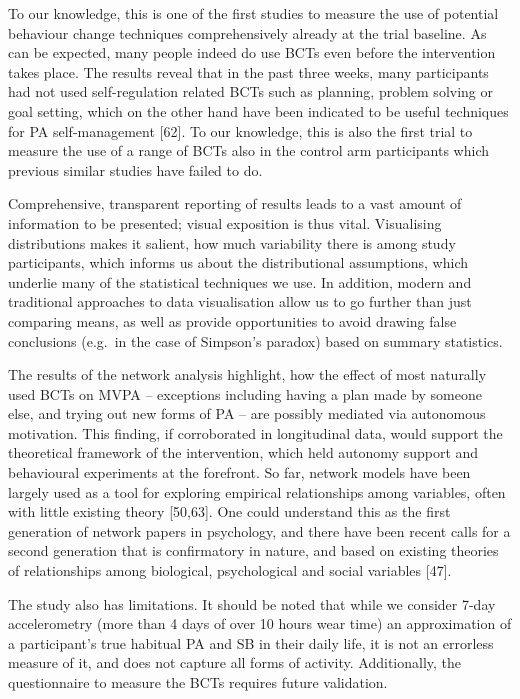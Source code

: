 \documentclass[english,man,floatsintext]{apa6}
\begin{document}
To our knowledge, this is one of the first studies to measure the use of potential behaviour change techniques comprehensively already at the trial baseline. As can be expected, many people indeed do use BCTs even before the intervention takes place. The results reveal that in the past three weeks, many participants had not used self-regulation related BCTs such as planning, problem solving or goal setting, which on the other hand have been indicated to be useful techniques for PA self-management {[}62{]}. To our knowledge, this is also the first trial to measure the use of a range of BCTs also in the control arm participants which previous similar studies have failed to do.

Comprehensive, transparent reporting of results leads to a vast amount of information to be presented; visual exposition is thus vital. Visualising distributions makes it salient, how much variability there is among study participants, which informs us about the distributional assumptions, which underlie many of the statistical techniques we use. In addition, modern and traditional approaches to data visualisation allow us to go further than just comparing means, as well as provide opportunities to avoid drawing false conclusions (e.g.~in the case of Simpson's paradox) based on summary statistics.

The results of the network analysis highlight, how the effect of most naturally used BCTs on MVPA -- exceptions including having a plan made by someone else, and trying out new forms of PA -- are possibly mediated via autonomous motivation. This finding, if corroborated in longitudinal data, would support the theoretical framework of the intervention, which held autonomy support and behavioural experiments at the forefront. So far, network models have been largely used as a tool for exploring empirical relationships among variables, often with little existing theory {[}50,63{]}. One could understand this as the first generation of network papers in psychology, and there have been recent calls for a second generation that is confirmatory in nature, and based on existing theories of relationships among biological, psychological and social variables {[}47{]}.

The study also has limitations. It should be noted that while we consider 7-day accelerometry (more than 4 days of over 10 hours wear time) an approximation of a participant's true habitual PA and SB in their daily life, it is not an errorless measure of it, and does not capture all forms of activity. Additionally, the questionnaire to measure the BCTs requires future validation.
\end{document}
